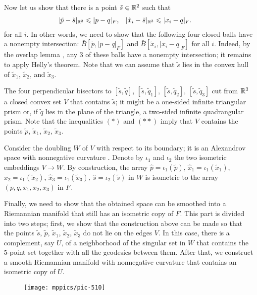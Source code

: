 \documentclass{article}
\begin{document}
Now let us show that there is a point $\tilde s\in\mathbb{R}^2$ such that
\begin{align*}
|\tilde p-\tilde s|_{\mathbb{R}^3}&\leqslant|p-q|_F,
&
|\tilde x_i-\tilde s|_{\mathbb{R}^3}&\leqslant|x_i-q|_F.
\end{align*}
for all $i$.
In other words, we need to show that the following four closed balls have a nonempty intersection: 
$\bar B[\tilde p,|p-q|_F]$ and
$\bar B[\tilde x_i,|x_i-q|_F]$ for all $i$.
Indeed, by the overlap lemma \cite{alexander2019alexandrov}, any 3 of these balls have a nonempty intersection;
it remains to apply Helly's theorem.
Note that we can assume that $\tilde s$ lies in the convex hull of $\tilde x_1$, $\tilde x_2$, and $\tilde x_3$.

The four perpendicular bisectors to 
$[\tilde s, \tilde q]$, 
$[\tilde s, \tilde q_1]$, 
$[\tilde s, \tilde q_2]$, 
$[\tilde s, \tilde q_3]$ cut from $\mathbb{R}^3$ a closed convex set $V$ that contains $\tilde s$;
it might be a one-sided infinite triangular prism or, if $\tilde q$ lies in the plane of the triangle, a two-sided infinite quadrangular prism.
Note that the inequalities $({*})$ and $({*}{*})$ imply that $V$ contains the points $\tilde p$, $\tilde x_1$, $\tilde x_2$, $\tilde x_3$.

Consider the doubling $W$ of $V$ with respect to its boundary;
it is an Alexandrov space with nonnegative curvature \cite[5.2]{perelman:spaces2}.
Denote by $\iota_1$ and $\iota_2$ the two isometric embeddings $V\to W$.
By construction, the array $\hat p=\iota_1(\tilde p)$, $\hat x_1=\iota_1(\tilde x_1)$, $\hat x_2=\iota_1(\tilde x_2)$, $\hat x_3=\iota_1(\tilde x_3)$,  $\hat s=\iota_2(\tilde s)$ in $W$ is isometric to the array $(p, q, x_1, x_2, x_3)$ in $F$.

\medskip

Finally, we need to show that the obtained space can be smoothed into a Riemannian manifold that still has an isometric copy of $F$.
This part is divided into two steps; first, we show that the construction above can be made so that the points $\tilde s$, $\tilde p$, $\tilde x_1$, $\tilde x_2$, $\tilde x_3$ do not lie on the edges $V$.
In this case, there is a complement, say $U$, of a neighborhood of the singular set in $W$ that contains
the 5-point set together with all the geodesics between them.
After that, we construct a smooth Riemannian manifold with nonnegative curvature that contains an isometric copy of $U$.

\begin{wrapfigure}{r}{30mm}
\vskip-0mm
\centering
\texttt{[image: mppics/pic-510]}
\end{wrapfigure}
\end{document}
